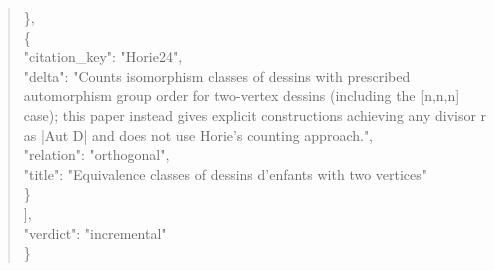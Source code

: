 \documentclass[11pt]{article}
\begin{document}
\begin{quote}
    \},\\
    \{\\
      "citation\_key": "Horie24",\\
      "delta": "Counts isomorphism classes of dessins with prescribed automorphism group order for two-vertex dessins (including the [n,n,n] case); this paper instead gives explicit constructions achieving any divisor r as |Aut D| and does not use Horie's counting approach.",\\
      "relation": "orthogonal",\\
      "title": "Equivalence classes of dessins d'enfants with two vertices"\\
    \}\\
  ],\\
  "verdict": "incremental"\\
\}\\
\end{quote}
\end{document}
